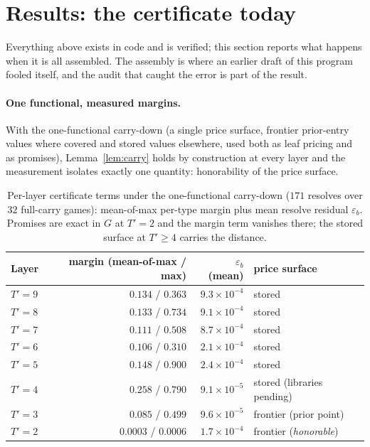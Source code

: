 \documentclass[11pt]{article}
\theoremstyle{plain}
\theoremstyle{definition}
\theoremstyle{remark}
\newcommand{\game}{\ensuremath{G}}
\begin{document}
\section{Results: the certificate today}\label{sec:results}

Everything above exists in code and is verified; this section reports
what happens when it is all assembled. The assembly is where an
earlier draft of this program fooled itself, and the audit that caught
the error is part of the result.

\paragraph{One functional, measured margins.} With the one-functional
carry-down (a single price surface, frontier prior-entry values where
covered and stored values elsewhere, used both as leaf pricing and as
promises), Lemma~\ref{lem:carry} holds by construction at every layer
and the measurement isolates exactly one quantity: honorability of the
price surface.

\begin{table}[t]
\centering
\caption{Per-layer certificate terms under the one-functional
carry-down ($171$ resolves over $32$ full-carry games): mean-of-max
per-type margin plus mean resolve residual $\varepsilon_b$. Promises
are exact in $\game$ at $T'{=}2$ and the margin term vanishes there;
the stored surface at $T'\ge4$ carries the distance.}
\label{tab:layerterms}
\small
\begin{tabular}{@{}lrrl@{}}
\toprule
Layer & margin (mean-of-max / max) & $\varepsilon_b$ (mean) & price surface\\
\midrule
$T'{=}9$ & $0.134$ / $0.363$ & $9.3\times10^{-4}$ & stored\\
$T'{=}8$ & $0.133$ / $0.734$ & $9.1\times10^{-4}$ & stored\\
$T'{=}7$ & $0.111$ / $0.508$ & $8.7\times10^{-4}$ & stored\\
$T'{=}6$ & $0.106$ / $0.310$ & $2.1\times10^{-4}$ & stored\\
$T'{=}5$ & $0.148$ / $0.900$ & $2.4\times10^{-4}$ & stored\\
$T'{=}4$ & $\mathbf{0.258}$ / $0.790$ & $9.1\times10^{-5}$ & stored (libraries pending)\\
$T'{=}3$ & $0.085$ / $0.499$ & $9.6\times10^{-5}$ & frontier (prior point)\\
$T'{=}2$ & $\mathbf{0.0003}$ / $0.0006$ & $1.7\times10^{-4}$ & frontier (\emph{honorable})\\
\bottomrule
\end{tabular}
\end{table}
\end{document}
